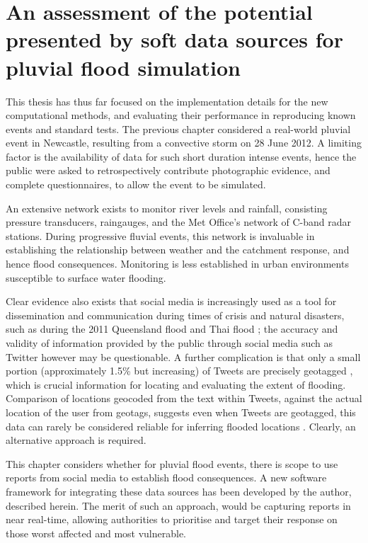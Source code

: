 \chapter{An assessment of the potential presented by soft data sources for pluvial flood simulation}
\label{chapter:SoftData}

This thesis has thus far focused on the implementation details for the new computational methods, and evaluating their performance in reproducing known events and standard tests. The previous chapter considered a real-world pluvial event in Newcastle, resulting from a convective storm on 28 June 2012. A limiting factor is the availability of data for such short duration intense events, hence the public were asked to retrospectively contribute photographic evidence, and complete questionnaires, to allow the event to be simulated.

An extensive network exists to monitor river levels and rainfall, consisting pressure transducers, raingauges, and the Met Office's network of C-band radar stations. During progressive fluvial events, this network is invaluable in establishing the relationship between weather and the catchment response, and hence flood consequences. Monitoring is less established in urban environments susceptible to surface water flooding.

Clear evidence also exists that social media is increasingly used as a tool for dissemination and communication during times of crisis and natural disasters, such as during the 2011 Queensland flood and Thai flood \citep{Starbird2010,Vieweg2010,Kongthon2012,Murthy2012}; the accuracy and validity of information provided by the public through social media such as Twitter however may be questionable. A further complication is that only a small portion (approximately 1.5\% but increasing) of Tweets are precisely geotagged \citep{Crampton2013}, which is crucial information for locating and evaluating the extent of flooding. Comparison of locations geocoded from the text within Tweets, against the actual location of the user from geotags, suggests even when Tweets are geotagged, this data can rarely be considered reliable for inferring flooded locations \citep{Leetaru2013}. Clearly, an alternative approach is required.

This chapter considers whether for pluvial flood events, there is scope to use reports from social media to establish flood consequences. A new software framework for integrating these data sources has been developed by the author, described herein. The merit of such an approach, would be capturing reports in near real-time, allowing authorities to prioritise and target their response on those worst affected and most vulnerable.

